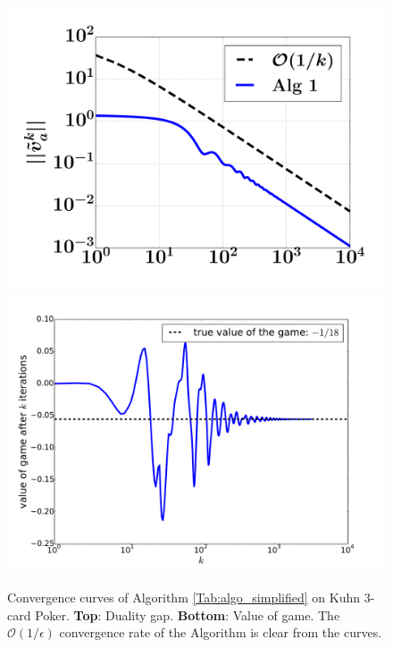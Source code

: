 \documentclass[12pt]{article}
\begin{document}
\begin{figure}
  \includegraphics[width=1\linewidth]{Kuhn3112_dgap.pdf}
  \includegraphics[width=1\linewidth]{Kuhn3112_NE.pdf}
  \caption{Convergence curves of Algorithm \ref{Tab:algo_simplified} on Kuhn 3-card Poker.
  \textbf{Top}: Duality gap. \textbf{Bottom}: Value of game.
   The $\mathcal{O}(1/\epsilon)$ convergence rate of the Algorithm is clear from the curves.}
  \label{Tab:dgap_curve}
\end{figure}

\end{document}
